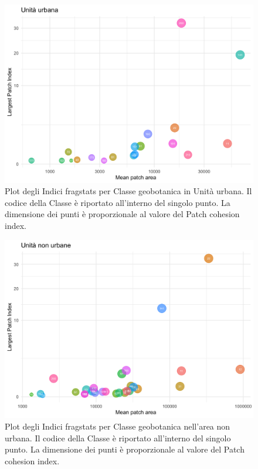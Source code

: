 \documentclass[
  a4paper,
]{book}
\begin{document}
\begin{figure}
\includegraphics[width=\linewidth]{./figs/fragUrbano} \caption{Plot degli Indici fragstats per Classe geobotanica in Unità urbana. Il codice della Classe è riportato all'interno del singolo punto. La dimensione dei punti è proporzionale al valore del Patch cohesion index.}\label{fig:fragUrbano}
\end{figure}

\begin{figure}
\includegraphics[width=\linewidth]{./figs/fragNoUrb} \caption{Plot degli Indici fragstats per Classe geobotanica nell'area non urbana. Il codice della Classe è riportato all'interno del singolo punto. La dimensione dei punti è proporzionale al valore del Patch cohesion index.}\label{fig:fragNoUrb}
\end{figure}
\end{document}
